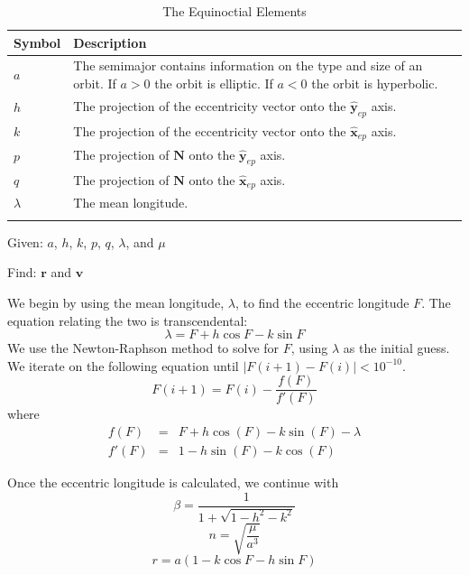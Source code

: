 \begin{table} \caption{The Equinoctial Elements}
\centering {}
\begin{tabular}{p{.5 in} p{5.0 in}}
  \hline\hline
   Symbol &  Description \\
  \hline
  $a$ &  The semimajor contains information on the type and size of an orbit.  If $a>0$ the orbit is elliptic.  If $a < 0$ the orbit is hyperbolic. \\
%
  $h$ &  The projection of the eccentricity vector onto the $\hat{\mathbf{y}}_{ep}$ axis. \\
  $k$ & The projection of the eccentricity vector onto the $\hat{\mathbf{x}}_{ep}$ axis. \\
  $p$ &  The projection of $\mathbf{N}$  onto the $\hat{\mathbf{y}}_{ep}$ axis.\\
  $q$ & The projection of $\mathbf{N}$  onto the $\hat{\mathbf{x}}_{ep}$ axis.  \\
  $\lambda$ & The mean longitude. \\
  \hline\hline \label{Table:EquinoctialElements}
\end{tabular}
\end{table}

\noindent Given: $a$, $h$, $k$, $p$, $q$, $\lambda$, and $\mu$

\noindent Find: $\mathbf{r}$ and $\mathbf{v}$

We begin by using the mean longitude, $\lambda$, to find the eccentric
longitude $F$.  The equation relating the two is transcendental:
\begin{equation}
     \lambda = F + h\cos{F} - k \sin{F}
\end{equation}
%
We use the Newton-Raphson method to solve for $F$, using $\lambda$
as the initial guess.  We iterate on the following equation until
$|F(i+1) - F(i)| < 10^{-10}$.
%
\begin{equation}
    F(i+1) = F(i) - \frac{f(F)}{f'(F)}
\end{equation}
%
where
%
\begin{eqnarray}
    f(F) &=& F + h \cos(F) - k\sin(F) - \lambda \\
    f'(F) &=& 1 - h \sin(F) - k \cos(F)
\end{eqnarray}

Once the eccentric longitude is calculated, we continue with
%
\begin{equation}
   \beta = \frac{1}{1 + \sqrt{1 - h^2 - k^2}} \label{Eq:Beta}
\end{equation}
%
\begin{equation}
   n = \sqrt{\frac{\mu}{a^3}}
\end{equation}
%
\begin{equation}
   r = a(1 - k\cos{F} - h\sin{F})
\end{equation}

